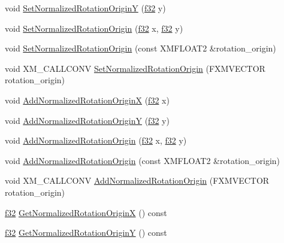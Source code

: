 \begin{DoxyCompactItemize}
\item 
void \hyperlink{structmage_1_1_sprite_transform_ac8546235b4090463eae78a990551c4f3}{Set\+Normalized\+Rotation\+OriginY} (\hyperlink{namespacemage_a6a44ad388483959dc4dff9f2aef91431}{f32} y)
\item 
void \hyperlink{structmage_1_1_sprite_transform_ac4253aec133bc15e8ba9fd01c846413e}{Set\+Normalized\+Rotation\+Origin} (\hyperlink{namespacemage_a6a44ad388483959dc4dff9f2aef91431}{f32} x, \hyperlink{namespacemage_a6a44ad388483959dc4dff9f2aef91431}{f32} y)
\item 
void \hyperlink{structmage_1_1_sprite_transform_a8cb44224f42f9b7811b39427c2745b3f}{Set\+Normalized\+Rotation\+Origin} (const X\+M\+F\+L\+O\+A\+T2 \&rotation\+\_\+origin)
\item 
void X\+M\+\_\+\+C\+A\+L\+L\+C\+O\+NV \hyperlink{structmage_1_1_sprite_transform_a820e4d9bcfaf0a66b325c5229c06de78}{Set\+Normalized\+Rotation\+Origin} (F\+X\+M\+V\+E\+C\+T\+OR rotation\+\_\+origin)
\item 
void \hyperlink{structmage_1_1_sprite_transform_aa505b54a1c081e91e1238d22487725bf}{Add\+Normalized\+Rotation\+OriginX} (\hyperlink{namespacemage_a6a44ad388483959dc4dff9f2aef91431}{f32} x)
\item 
void \hyperlink{structmage_1_1_sprite_transform_aee903f2612fd60682377948f4b3fc26d}{Add\+Normalized\+Rotation\+OriginY} (\hyperlink{namespacemage_a6a44ad388483959dc4dff9f2aef91431}{f32} y)
\item 
void \hyperlink{structmage_1_1_sprite_transform_a3c06b267e0504df1559a52943eabd2ef}{Add\+Normalized\+Rotation\+Origin} (\hyperlink{namespacemage_a6a44ad388483959dc4dff9f2aef91431}{f32} x, \hyperlink{namespacemage_a6a44ad388483959dc4dff9f2aef91431}{f32} y)
\item 
void \hyperlink{structmage_1_1_sprite_transform_a40a99b8114f448717ce1f7c7644ea6ee}{Add\+Normalized\+Rotation\+Origin} (const X\+M\+F\+L\+O\+A\+T2 \&rotation\+\_\+origin)
\item 
void X\+M\+\_\+\+C\+A\+L\+L\+C\+O\+NV \hyperlink{structmage_1_1_sprite_transform_a5571cc3e5700aba23f8c229675f10c3e}{Add\+Normalized\+Rotation\+Origin} (F\+X\+M\+V\+E\+C\+T\+OR rotation\+\_\+origin)
\item 
\hyperlink{namespacemage_a6a44ad388483959dc4dff9f2aef91431}{f32} \hyperlink{structmage_1_1_sprite_transform_a65b1fea4bfe77b8bdf804d2d8a93b213}{Get\+Normalized\+Rotation\+OriginX} () const
\item 
\hyperlink{namespacemage_a6a44ad388483959dc4dff9f2aef91431}{f32} \hyperlink{structmage_1_1_sprite_transform_aadedc31aa6d7145b40dc0d1e2e9a7038}{Get\+Normalized\+Rotation\+OriginY} () const

\end{DoxyCompactItemize}
